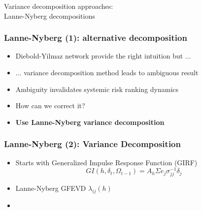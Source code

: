 \documentclass[aspectratio=43,dvipsnames,usenames, svgnames]{beamer}
\begin{document}
\begin{frame} %
\begin{center} 
	\Large{Variance decomposition approaches:\\
	Lanne-Nyberg decompositions}
\end{center}
\end{frame}

\begin{frame} %
\frametitle{Lanne-Nyberg (1): alternative decomposition}
\smallskip
	\begin{itemize}
		\item Diebold-Yilmaz network provide the right intuition but ...
		\smallskip
		\item ... variance decomposition method leads to ambiguous result
		\smallskip
		\item Ambiguity invalidates systemic risk ranking dynamics
		\smallskip
		\item How can we correct it?
		\smallskip
		\item \textbf{{\color{red}Use Lanne-Nyberg variance decomposition}}
	\end{itemize}
\end{frame}

\begin{frame} %
\frametitle{Lanne-Nyberg (2): Variance Decomposition}
	\begin{itemize}
		\item Starts with Generalized Impulse Response Function (GIRF)
		\begin{equation*}
			GI(h,\delta_t,\Omega_{t-1}) = A_h \Sigma e_j \sigma_{jj}^{-1} \delta_j	
		\end{equation*}
		\item Lanne-Nyberg GFEVD $\lambda_{ij}(h)$
		\smallskip
		\item[]
		\begin{center}
		\end{center}
	\end{itemize}
\end{frame}
\end{document}
